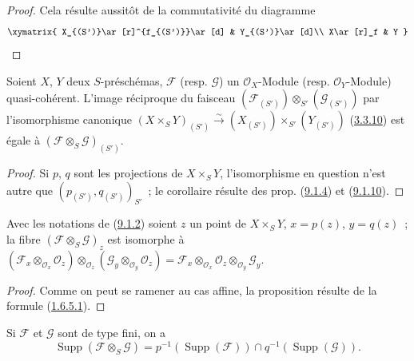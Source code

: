 \begin{proof}
Cela résulte aussitôt de la commutativité du diagramme
\[
  \xymatrix{
    X_{(S')}\ar[r]^{f_{(S')}}\ar[d] &
    Y_{(S')}\ar[d]\\
    X\ar[r]_f &
    Y
  }
\]
\end{proof}

\begin{corollary}[9.1.11]
\label{I.9.1.11-fr}
Soient $X$, $Y$ deux $S$-préschémas, $\mathscr{F}$ \textup{(resp. $\mathscr{G}$)} un
$\mathscr{O}_X$-Module \textup{(resp.} $\mathscr{O}_Y$-Module) quasi-cohérent.
L'image réciproque du faisceau
$(\mathscr{F}_{(S')})\otimes_{S'}(\mathscr{G}_{(S')})$ par l'isomorphisme
canonique
$(X\times_S Y)_{(S')}\xrightarrow{\sim}
(X_{(S')})\times_{S'}(Y_{(S')})$
\textup{(\hyperref[I.3.3.10-fr]{3.3.10})} est égale à
$(\mathscr{F}\otimes_S\mathscr{G})_{(S')}$.
\end{corollary}

\begin{proof}
Si $p$, $q$ sont les projections de $X\times_S Y$, l'isomorphisme en
question n'est autre que $(p_{(S')},q_{(S')})_{S'}$~; le corollaire résulte
des prop. (\hyperref[I.9.1.4-fr]{9.1.4}) et
(\hyperref[I.9.1.10-fr]{9.1.10}).
\end{proof}

\begin{proposition}[9.1.12]
\label{I.9.1.12-fr}
Avec les notations de \textup{(\hyperref[I.9.1.2-fr]{9.1.2})} soient $z$ un point de
$X\times_S Y$, $x=p(z)$, $y=q(z)$~; la fibre
$(\mathscr{F}\otimes_S\mathscr{G})_z$ est isomorphe à
$(\mathscr{F}_x\otimes_{\mathscr{O}_x}\mathscr{O}_z)
\otimes_{\mathscr{O}_z}
(\mathscr{G}_y\otimes_{\mathscr{O}_y}\mathscr{O}_z)
=\mathscr{F}_x\otimes_{\mathscr{O}_x}\mathscr{O}_z
\otimes_{\mathscr{O}_y}\mathscr{G}_y$.
\end{proposition}

\begin{proof}
Comme on peut se ramener au cas affine, la proposition résulte de la formule
(\hyperref[I.1.6.5.1-fr]{1.6.5.1}).
\end{proof}

\begin{corollary}[9.1.13]
\label{I.9.1.13-fr}
Si $\mathscr{F}$ et $\mathscr{G}$ sont de type fini, on a
\[
  \operatorname{Supp}(\mathscr{F}\otimes_S\mathscr{G})
  =p^{-1}(\operatorname{Supp}(\mathscr{F}))
  \cap q^{-1}(\operatorname{Supp}(\mathscr{G})).
\]
\end{corollary}


